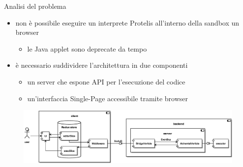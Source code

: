     \begin{frame}{\insertsectionhead}{\insertsubsectionhead}

      \begin{block}{Analisi del problema}
        \begin{itemize}
          \item
            non è possibile eseguire un interprete Protelis all'interno della sandbox un browser
            \begin{itemize}
              \item le Java applet sono deprecate da tempo
            \end{itemize}
          \item
            è necessario suddividere l'architettura in due componenti
            \begin{itemize}
              \item un server che espone API per l'esecuzione del codice
              \item un'interfaccia Single-Page accessibile tramite browser
            \end{itemize}
        \end{itemize}
      \end{block}

      \begin{figure}
        \includegraphics[width=.71\textwidth]{../res/uml/architecture-design.eps}
      \end{figure}
    \end{frame}
